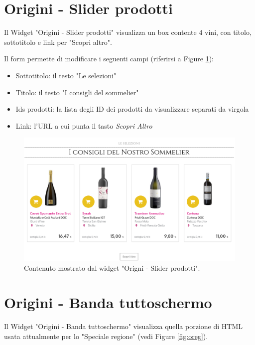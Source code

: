 


\newpage


\section{Origini - Slider prodotti}
Il Widget "Origini - Slider prodotti" visualizza un box contente
4 vini, con titolo, sottotitolo e link per "Scopri altro".

Il form permette di modificare i seguenti campi (riferirsi a Figure \ref{fig:oprod}):
\begin{itemize}
\item Sottotitolo: il testo "Le selezioni"
\item Titolo: il testo "I consigli del sommelier"
\item Ids prodotti: la lista degli ID dei prodotti da visualizzare separati da virgola
\item Link: l'URL a cui punta il tasto \emph{Scopri Altro}
\end{itemize}

\begin{figure}
  \includegraphics[width=\textwidth]{figure/oprod.png}
  \caption{Contenuto mostrato dal widget "Origni - Slider prodotti".}
  \label{fig:oprod}
\end{figure}


\newpage
\section{Origini - Banda tuttoschermo}
Il Widget "Origini - Banda tuttoschermo" visualizza quella porzione di HTML
usata attualmente per lo "Speciale regione" (vedi Figure \ref{fig:oreg}).

